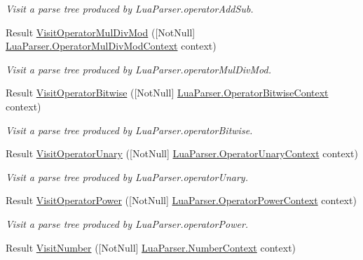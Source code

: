 \begin{DoxyCompactItemize}
\begin{DoxyCompactList}\small\item\em Visit a parse tree produced by Lua\+Parser.\+operator\+Add\+Sub. \end{DoxyCompactList}\item 
Result \mbox{\hyperlink{interfacezlua_1_1_i_lua_visitor_a3d3f85dff116b4052af62e3d712fb958}{Visit\+Operator\+Mul\+Div\+Mod}} (\mbox{[}Not\+Null\mbox{]} \mbox{\hyperlink{classzlua_1_1_lua_parser_1_1_operator_mul_div_mod_context}{Lua\+Parser.\+Operator\+Mul\+Div\+Mod\+Context}} context)
\begin{DoxyCompactList}\small\item\em Visit a parse tree produced by Lua\+Parser.\+operator\+Mul\+Div\+Mod. \end{DoxyCompactList}\item 
Result \mbox{\hyperlink{interfacezlua_1_1_i_lua_visitor_ac5cb1dcc8f0882eb1c52441549d66026}{Visit\+Operator\+Bitwise}} (\mbox{[}Not\+Null\mbox{]} \mbox{\hyperlink{classzlua_1_1_lua_parser_1_1_operator_bitwise_context}{Lua\+Parser.\+Operator\+Bitwise\+Context}} context)
\begin{DoxyCompactList}\small\item\em Visit a parse tree produced by Lua\+Parser.\+operator\+Bitwise. \end{DoxyCompactList}\item 
Result \mbox{\hyperlink{interfacezlua_1_1_i_lua_visitor_aef0728911afc4d23d64f1b6f0cd575b3}{Visit\+Operator\+Unary}} (\mbox{[}Not\+Null\mbox{]} \mbox{\hyperlink{classzlua_1_1_lua_parser_1_1_operator_unary_context}{Lua\+Parser.\+Operator\+Unary\+Context}} context)
\begin{DoxyCompactList}\small\item\em Visit a parse tree produced by Lua\+Parser.\+operator\+Unary. \end{DoxyCompactList}\item 
Result \mbox{\hyperlink{interfacezlua_1_1_i_lua_visitor_aca792a2823d12a1cb5a7dc7cf86550b4}{Visit\+Operator\+Power}} (\mbox{[}Not\+Null\mbox{]} \mbox{\hyperlink{classzlua_1_1_lua_parser_1_1_operator_power_context}{Lua\+Parser.\+Operator\+Power\+Context}} context)
\begin{DoxyCompactList}\small\item\em Visit a parse tree produced by Lua\+Parser.\+operator\+Power. \end{DoxyCompactList}\item 
Result \mbox{\hyperlink{interfacezlua_1_1_i_lua_visitor_aef219d971f96173231ecdae24f14c988}{Visit\+Number}} (\mbox{[}Not\+Null\mbox{]} \mbox{\hyperlink{classzlua_1_1_lua_parser_1_1_number_context}{Lua\+Parser.\+Number\+Context}} context)

\end{DoxyCompactItemize}
